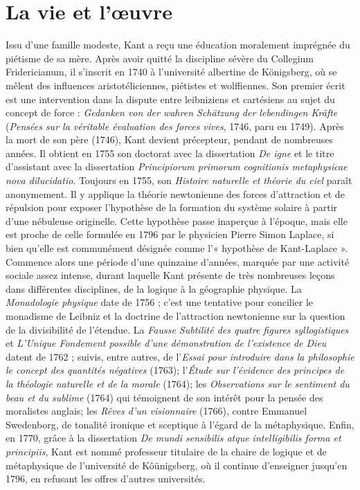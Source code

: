 
\section{La vie et l’œuvre}


Issu d’une famille modeste, Kant a reçu
une éducation moralement imprégnée du
piétisme de sa mère. Après avoir quitté la
discipline sévère du Collegium Fridericianum,
il s'inscrit en 1740 à l’université
albertine de Königsberg, où se mêlent des
influences aristotéliciennes, piétistes et
wolffiennes. Son premier écrit est une
intervention dans la dispute entre leibniziens
et cartésiens au sujet du concept de
force : {\it Gedanken von der wahren Schätzung
der lebendingen Kräfte} ({\it Pensées sur
la véritable évaluation des forces vives},
1746, paru en 1749). Après la mort de son
père (1746), Kant devient précepteur,
pendant de nombreuses années. Il obtient
en 1755 son doctorat avec la dissertation
{\it De igne} et le titre d’assistant avec la dissertation
{\it Principiorum primorum cognitionis
metaphysicae nova dilucidatio}.
Toujours en 1755, son {\it Histoire naturelle et
théorie du ciel} paraît anonymement. Il y
applique la théorie newtonienne des
forces d’attraction et de répulsion pour
exposer l’hypothèse de la formation du
système solaire à partir d’une nébuleuse
originelle. Cette hypothèse passe inaperçue
à l’époque, mais elle est proche de
celle formulée en 1796 par le physicien
Pierre Simon Laplace, si bien qu’elle est
communément désignée comme l’« hypothèse
de Kant-Laplace ». Commence
alors une période d’une quinzaine d’années,
marquée par une activité sociale
assez intense, durant laquelle Kant présente
de très nombreuses leçons dans différentes
disciplines, de la logique à la
géographie physique. La {\it Monadologie
physique} date de 1756 ; c’est une tentative
pour concilier le monadisme de Leibniz et
la doctrine de l’attraction newtonienne
sur la question de la divisibilité de l’étendue.
La {\it Fausse Subtilité des quatre figures
syllogistiques} et {\it L'Unique Fondement
possible d’une démonstration de l’existence
de Dieu} datent de 1762 ; suivis, entre
autres, de l’{\it Essai pour introduire dans la
philosophie le concept des quantités négatives}
(1763); l’{\it Étude sur l'évidence des
principes de la théologie naturelle et de la
morale} (1764); les {\it Observations sur le
sentiment du beau et du sublime} (1764) qui
témoignent de son intérêt pour la pensée
des moralistes anglais; les {\it Rêves d’un
visionnaire} (1766), contre Emmanuel
Swedenborg, de tonalité ironique et sceptique
à l’égard de la métaphysique. Enfin,
en 1770, grâce à la dissertation {\it De mundi
sensibilis atque intelligibilis forma et principiis},
Kant est nommé professeur titulaire
de la chaire de logique et de
métaphysique de l’université de Kôünigsberg,
où il continue d’enseigner jusqu’en
1796, en refusant les offres d’autres universités.

